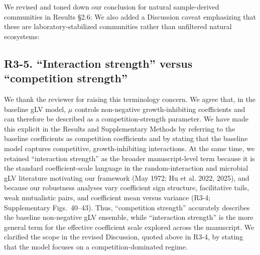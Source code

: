 \responselabel
We revised and toned down our conclusion for natural sample-derived communities in Results \S2.6:  We also added a Discussion caveat emphasizing that these are laboratory-stabilized communities rather than unfiltered natural ecosystems: 

\subsection*{R3-5. ``Interaction strength'' versus ``competition strength''}


\responselabel
We thank the reviewer for raising this terminology concern. We agree that, in the baseline gLV model, $\mu$ controls non-negative growth-inhibiting coefficients and can therefore be described as a competition-strength parameter. We have made this explicit in the Results and Supplementary Methods by referring to the baseline coefficients as competition coefficients and by stating that the baseline model captures competitive, growth-inhibiting interactions. At the same time, we retained ``interaction strength'' as the broader manuscript-level term because it is the standard coefficient-scale language in the random-interaction and microbial gLV literature motivating our framework (May 1972; Hu et al. 2022, 2025), and because our robustness analyses vary coefficient sign structure, facilitative tails, weak mutualistic pairs, and coefficient mean versus variance (R3-4; Supplementary Figs.~40--43). Thus, ``competition strength'' accurately describes the baseline non-negative gLV ensemble, while ``interaction strength'' is the more general term for the effective coefficient scale explored across the manuscript. We clarified the scope in the revised Discussion, quoted above in R3-4, by stating that the model focuses on a competition-dominated regime.
